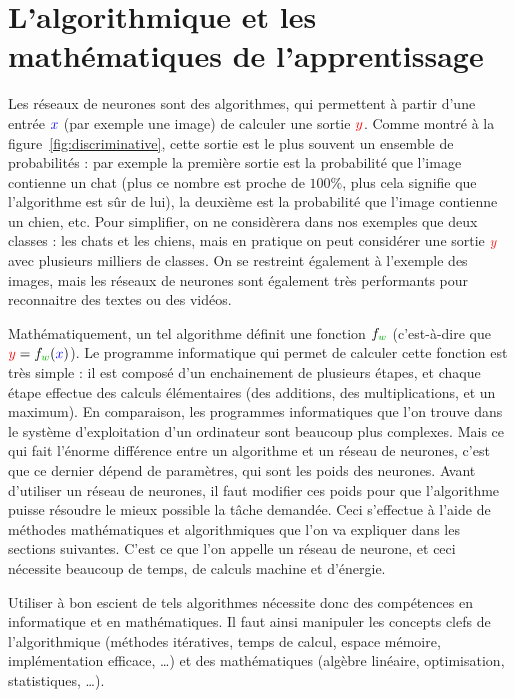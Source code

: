 
\section{L'algorithmique et les mathématiques de l'apprentissage}

Les réseaux de neurones sont des algorithmes, qui permettent à partir d'une entrée $\myblue{x}$ (par exemple une image) de calculer une sortie ${\color{red} y}$. Comme montré à la figure~\ref{fig:discriminative}, cette sortie est le plus souvent un ensemble de probabilités : par exemple la première sortie est la probabilité que l'image contienne un chat (plus ce nombre est proche de $100\%$, plus cela signifie que l'algorithme est sûr de lui), la deuxième est la probabilité que l'image contienne un chien, etc. 
%
Pour simplifier,  on ne considèrera dans nos exemples que deux classes : les chats et les chiens, mais en pratique on peut considérer une sortie  ${\color{red} y}$  avec plusieurs milliers de classes. On se restreint également à l'exemple des images, mais les réseaux de neurones sont également très performants pour reconnaitre des textes ou des vidéos.

Mathématiquement, un tel algorithme définit une fonction $f_{\mygreen{w}}$ (c'est-à-dire que ${\color{red} y} = f_{\mygreen{w}}({\color{blue}x})$). Le programme informatique qui permet de calculer cette fonction est très simple : il est composé d'un enchainement de plusieurs étapes, et chaque étape effectue des calculs élémentaires (des additions, des multiplications, et un maximum). 
%
En comparaison, les programmes informatiques que l'on trouve dans le système d'exploitation d'un ordinateur sont beaucoup plus complexes. 
%
Mais ce qui fait l'énorme différence entre un algorithme  et un réseau de neurones, c'est que ce dernier dépend de paramètres, qui sont les poids des neurones. Avant d'utiliser un réseau de neurones, il faut modifier ces poids pour que l'algorithme puisse résoudre le mieux possible la tâche demandée. Ceci s'effectue à l'aide de méthodes mathématiques et algorithmiques que l'on va expliquer dans les sections suivantes. C'est ce que l'on appelle  un réseau de neurone, et ceci nécessite beaucoup de temps, de calculs machine et d'énergie. 


Utiliser à bon escient de tels algorithmes nécessite donc des compétences en informatique et en mathématiques. Il faut ainsi manipuler les concepts clefs de l'algorithmique (méthodes itératives, temps de calcul, espace mémoire, implémentation efficace, \ldots) et des mathématiques (algèbre linéaire, optimisation, statistiques, \ldots).  


